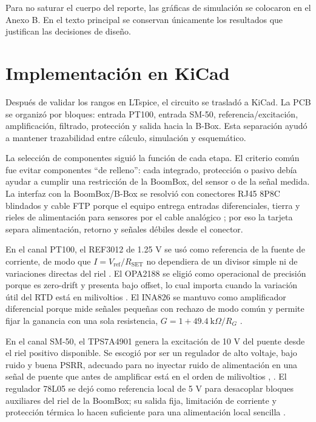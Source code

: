 \documentclass[conference]{IEEEtran}
\begin{document}
Para no saturar el cuerpo del reporte, las gráficas de simulación se colocaron en el Anexo B. En el texto principal se conservan únicamente los resultados que justifican las decisiones de diseño.

\section{Implementación en KiCad}

Después de validar los rangos en LTspice, el circuito se trasladó a KiCad. La PCB se organizó por bloques: entrada PT100, entrada SM-50, referencia/excitación, amplificación, filtrado, protección y salida hacia la B-Box. Esta separación ayudó a mantener trazabilidad entre cálculo, simulación y esquemático.

La selección de componentes siguió la función de cada etapa. El criterio común fue evitar componentes ``de relleno'': cada integrado, protección o pasivo debía ayudar a cumplir una restricción de la BoomBox, del sensor o de la señal medida. La interfaz con la BoomBox/B-Box se resolvió con conectores RJ45 8P8C blindados y cable FTP porque el equipo entrega entradas diferenciales, tierra y rieles de alimentación para sensores por el cable analógico \cite{imperix}; por eso la tarjeta separa alimentación, retorno y señales débiles desde el conector.

En el canal PT100, el REF3012 de 1.25 V se usó como referencia de la fuente de corriente, de modo que $I=V_{\text{ref}}/R_{\text{SET}}$ no dependiera de un divisor simple ni de variaciones directas del riel \cite{ref30}. El OPA2188 se eligió como operacional de precisión porque es zero-drift y presenta bajo offset, lo cual importa cuando la variación útil del RTD está en milivoltios \cite{opa2188}. El INA826 se mantuvo como amplificador diferencial porque mide señales pequeñas con rechazo de modo común y permite fijar la ganancia con una sola resistencia, $G=1+49.4~\text{k}\Omega/R_G$ \cite{ina826}.

En el canal SM-50, el TPS7A4901 genera la excitación de 10 V del puente desde el riel positivo disponible. Se escogió por ser un regulador de alto voltaje, bajo ruido y buena PSRR, adecuado para no inyectar ruido de alimentación en una señal de puente que antes de amplificar está en el orden de milivoltios \cite{tps7a49}, \cite{interface}. El regulador 78L05 se dejó como referencia local de 5 V para desacoplar bloques auxiliares del riel de la BoomBox; su salida fija, limitación de corriente y protección térmica lo hacen suficiente para una alimentación local sencilla \cite{lm78l}.
\end{document}
